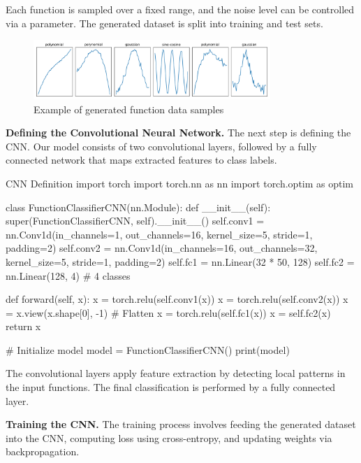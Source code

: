 Each function is sampled over a fixed range, and the noise level can be controlled via a parameter. The generated dataset is split into training and test sets.

\begin{figure}[h]
    \centering
    \includegraphics[width=0.8\textwidth]{images/cnn_data_samples_selected.png}
    \caption{Example of generated function data samples}
    \label{fig:data_samples}
\end{figure}

{\bf Defining the Convolutional Neural Network.} The next step is defining the CNN. Our model consists of two convolutional layers, followed by a fully connected network that maps extracted features to class labels.

\begin{codeonly}{CNN Definition}
import torch
import torch.nn as nn
import torch.optim as optim

class FunctionClassifierCNN(nn.Module):
    def __init__(self):
        super(FunctionClassifierCNN, self).__init__()
        self.conv1 = nn.Conv1d(in_channels=1, out_channels=16, kernel_size=5, stride=1, padding=2)
        self.conv2 = nn.Conv1d(in_channels=16, out_channels=32, kernel_size=5, stride=1, padding=2)
        self.fc1 = nn.Linear(32 * 50, 128)
        self.fc2 = nn.Linear(128, 4)  # 4 classes

    def forward(self, x):
        x = torch.relu(self.conv1(x))
        x = torch.relu(self.conv2(x))
        x = x.view(x.shape[0], -1)  # Flatten
        x = torch.relu(self.fc1(x))
        x = self.fc2(x)
        return x

# Initialize model
model = FunctionClassifierCNN()
print(model)
\end{codeonly}

The convolutional layers apply feature extraction by detecting local patterns in the input functions. The final classification is performed by a fully connected layer.

{\bf Training the CNN.} The training process involves feeding the generated dataset into the CNN, computing loss using cross-entropy, and updating weights via backpropagation.

